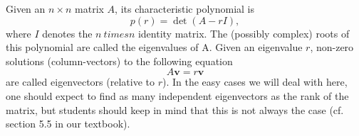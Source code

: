 \documentclass[11pt]{amsart}
\numberwithin{equation}{section}
\begin{document}
Given an $n \times n$ matrix $A$, its characteristic polynomial is 
\begin{equation*}
p(r) = \det(A-rI),
\end{equation*}
where $I$ denotes the $n\ times n$ identity matrix. The (possibly complex) roots of this polynomial are called the eigenvalues of A. Given an eigenvalue $r$, non-zero solutions (column-vectors) to the following equation
\begin{equation*}
A\mathbf{v}=r\mathbf{v}
\end{equation*}
are called eigenvectors (relative to $r$). In the easy cases we will deal with here, one should expect to find as many independent eigenvectors as the rank of the matrix, but students should keep in mind that this is not always the case (cf. section 5.5 in our textbook).
\end{document}
